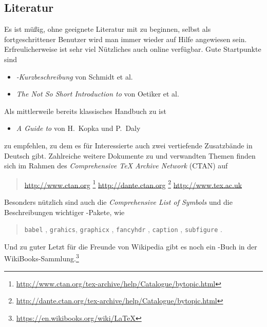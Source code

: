 \subsection{Literatur}
\label{sec:literatur}

Es ist müßig, ohne geeignete Literatur mit \latex zu beginnen, selbst
als fortgeschrittener Benutzer wird man immer wieder auf Hilfe angewiesen
sein. Erfreulicherweise ist sehr viel Nützliches auch online verfügbar.
Gute Startpunkte sind \zB
%
\begin{itemize}
\item \emph{{\rm\LaTeXe}-Kurzbeschreibung} von Schmidt et al.\ \cite{Schmidt01}
\item \emph{The Not So Short Introduction to {\rm \LaTeXe}}
            von Oetiker et al.\ \cite{Oetiker01}
\end{itemize}
%
\noindent
Als mittlerweile bereits klassisches Handbuch zu \latex ist
%
\begin{itemize}
  \item \emph{A Guide to {\rm\LaTeXe}} von H.~Kopka und P.~Daly \cite{Kopka98}
\end{itemize}
%
zu empfehlen, zu dem es für Interessierte auch zwei vertiefende
Zusatzbände in Deutsch gibt. Zahlreiche weitere Dokumente zu
\latex und verwandten Themen finden sich \ua im Rahmen des {\em
Comprehensive TeX Archive Network} (CTAN) auf
\begin{quote}
	\url{http://www.ctan.org}%
	\footnote{\url{http://www.ctan.org/tex-archive/help/Catalogue/bytopic.html}}\newline
	\url{http://dante.ctan.org}%
	\footnote{\url{http://dante.ctan.org/tex-archive/help/Catalogue/bytopic.html}}\newline
	\url{http://www.tex.ac.uk}
\end{quote}
%
Besonders nützlich sind auch die
\emph{Comprehensive List of {\rm \latex} Symbols} \cite{Pakin01}
und die Beschreibungen wichtiger \latex-Pakete, wie
%
\begin{quote}
	\texttt{babel} \cite{Braams2008},\newline
  \texttt{grahics}, \texttt{graphicx} \cite{Carlisle99},\newline
  \texttt{fancyhdr} \cite{Oostrum97},\newline
  \texttt{caption} \cite{Sommerfeldt07},\newline
  \texttt{subfigure} \cite{Cochran95}.
\end{quote}


Und zu guter Letzt für die Freunde von Wikipedia gibt es noch ein \latex-Buch in der WikiBooks-Sammlung.\footnote{\url{https://en.wikibooks.org/wiki/LaTeX}}


